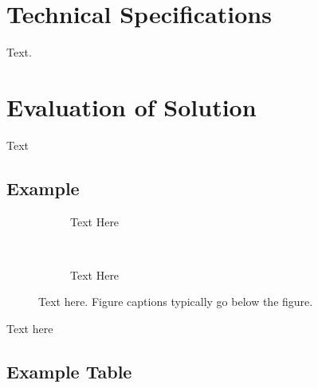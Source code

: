 \documentclass[a4paper, 12pt, english]{article}
\begin{document}
    \section{Technical Specifications}
        \label{sec: Technical Specifications}

        Text.


    \section{Evaluation of Solution}
        \label{sec: Evaluation of Solution}

        Text



    \newpage




    \newpage


    \appendices

        \subsection{Example}\label{app:example}
            \begin{figure}[!h]
                \begin{subfigure}[t]{0.45\textwidth}
                    \centering
                    \caption{Text Here}
                    \label{subfig: example1}
                \end{subfigure}
                ~
                \begin{subfigure}[t]{0.45\textwidth}
                    \centering
                    \caption{Text Here}
                    \label{subfig: example2}
                \end{subfigure}
                

                \caption{Text here. Figure captions typically go below the figure.}
                \label{fig: example}
            \end{figure}

            \FloatBarrier

            Text here


        \subsection{Example Table}
            \label{app: example table}
\end{document}
